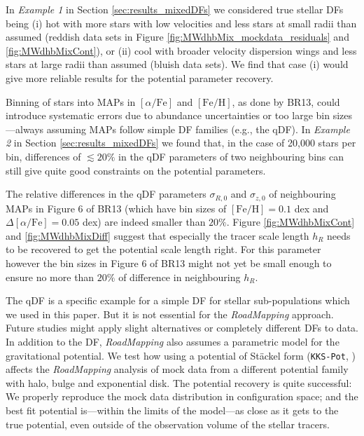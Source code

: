 \documentclass[iop,revtex4]{emulateapj}
\newcommand{\MAPs}{MAPs}
\newcommand{\RM}{{\sl RoadMapping}}
\begin{document}
In \emph{Example 1} in Section \ref{sec:results_mixedDFs} we considered true stellar DFs being (i) hot with more stars with low velocities and less stars at small radii than assumed (reddish data sets in Figure \ref{fig:MWdhbMix_mockdata_residuals} and \ref{fig:MWdhbMixCont}), or (ii) cool with broader velocity dispersion wings and less stars at large radii than assumed (bluish data sets). We find that case (i) would give more reliable results for the potential parameter recovery.

Binning of stars into \MAPs{} in $[\alpha/\mathrm{Fe}]$ and $[\mathrm{Fe}/\mathrm{H}]$, as done by BR13, could introduce systematic errors due to abundance uncertainties or too large bin sizes---always assuming \MAPs{} follow simple DF families (e.g., the qDF). In \emph{Example 2} in Section \ref{sec:results_mixedDFs} we found that, in the case of 20,000 stars per bin, differences of $\lesssim 20\%$ in the qDF parameters of two neighbouring bins can still give quite good constraints on the potential parameters.

The relative differences in the qDF parameters $\sigma_{R,0}$ and $\sigma_{z,0}$ of neighbouring \MAPs{} in Figure 6 of BR13 (which have bin sizes of $[\mathrm{Fe}/\mathrm{H}] = 0.1$ dex and $\Delta [\alpha/\mathrm{Fe}] = 0.05$ dex) are indeed smaller than $20\%$. Figure \ref{fig:MWdhbMixCont} and \ref{fig:MWdhbMixDiff} suggest that especially the tracer scale length $h_R$ needs to be recovered to get the potential scale length right. For this parameter however the bin sizes in Figure 6 of BR13 might not yet be small enough to ensure no more than $20\%$ of difference in neighbouring $h_R$.

The qDF is a specific example for a simple DF for stellar sub-populations which we used in this paper. But it is not essential for the \RM{} approach. Future studies might apply slight alternatives or completely different DFs to data.\\

 In addition to the DF, \RM{} also assumes a parametric model for the gravitational potential. We test how using a potential of St\"{a}ckel form (\texttt{KKS-Pot}, \citealt{1994AA...287...43B}) affects the \RM{} analysis of mock data from a different potential family with halo, bulge and exponential disk. The potential recovery is quite successful: We properly reproduce the mock data distribution in configuration space; and the best fit potential is---within the limits of the model---as close as it gets to the true potential, even outside of the observation volume of the stellar tracers. 
\end{document}

